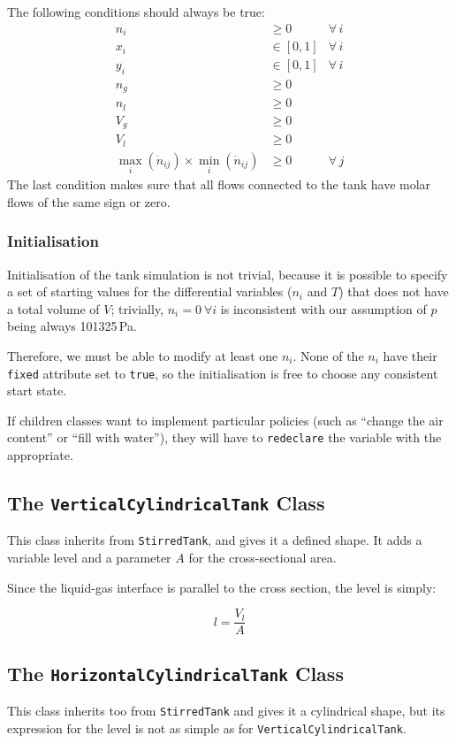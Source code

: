 \documentclass[a4paper]{article}
\begin{document}
The following conditions should always be true:
\begin{align}
n_i & \geq 0 & \forall \, i\\
x_i & \in [0,1] & \forall \, i\\
y_i & \in [0,1] & \forall \, i\\
n_g & \geq 0\\
n_l & \geq 0\\
V_g & \geq 0\\
V_l & \geq 0\\
\max_i(\dot n_{ij}) \times \min_i(\dot n_{ij}) & \geq 0 & \forall \, j
\end{align}
The last condition makes sure that all flows connected to the tank have molar
flows of the same sign or zero.

\subsubsection{Initialisation}
Initialisation of the tank simulation is not trivial, because it is possible to
specify a set of starting values for the differential variables ($n_i$ and $T$)
that does not have a total volume of $V$; trivially, $n_i = 0 ~ \forall i$ is
inconsistent with our assumption of $p$ being always 101325\,Pa.

Therefore, we must be able to modify at least one $n_i$. None of the $n_i$ have
their \texttt{fixed} attribute set to \texttt{true}, so the initialisation is
free to choose any consistent start state.

If children classes want to implement particular policies (such as ``change the
air content'' or ``fill with water''), they will have to \texttt{redeclare} the
variable with the appropriate.

\subsection{The \texttt{VerticalCylindricalTank} Class}
This class inherits from \texttt{StirredTank}, and gives it a defined shape.
It adds a variable level and a parameter $A$ for the cross-sectional area.

Since the liquid-gas interface is parallel to the cross section, the level is
simply:

\begin{equation}
l = \frac{V_l}{A}
\end{equation}

\subsection{The \texttt{HorizontalCylindricalTank} Class}
This class inherits too from \texttt{StirredTank} and gives it a cylindrical
shape, but its expression for the level is not as simple as for
\texttt{VerticalCylindricalTank}.
\end{document}
